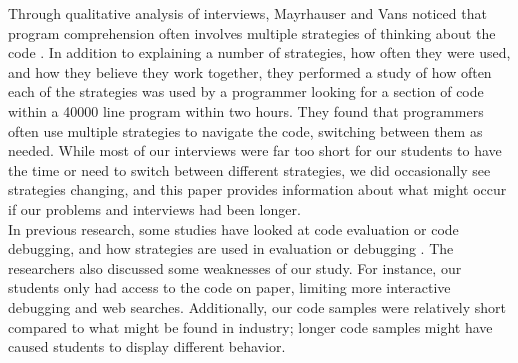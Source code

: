 Through qualitative analysis of interviews, Mayrhauser and Vans noticed that program comprehension often involves multiple strategies of thinking about the code \cite{402076}.
In addition to explaining a number of strategies, how often they were used, and how they believe they work together, they performed a study of how often each of the strategies was used by a programmer looking for a section of code within a 40000 line program within two hours. They found that programmers often use multiple strategies to navigate the code, switching between them as needed.
While most of our interviews were far too short for our students to have the time or need to switch between different strategies, we did occasionally see strategies changing, and this paper provides information about what might occur if our problems and interviews had been longer. \\

In previous research, some studies have looked at code evaluation or code debugging, and how strategies are used in evaluation or debugging \citeyear{mosemann2001, fitzgerald2008, 1021348, 402076}.
The researchers also discussed some weaknesses of our study. 
For instance, our students only had access to the code on paper, limiting more interactive debugging and web searches.
Additionally, our code samples were relatively short compared to what might be found in industry;
 longer code samples might have caused students to display different behavior.

\newpage
